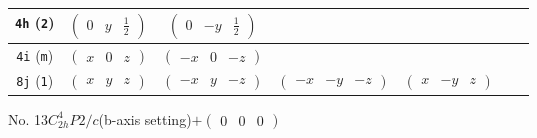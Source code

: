 \documentclass[fleqn,9pt,landscape]{jsarticle}
\begin{document}
\begin{center}
\begin{longtable}{ccccccc}
{\tt 4h} ({\tt 2}) & $ \begin{pmatrix} 0 & y & \frac{1}{2} \end{pmatrix} $ & $ \begin{pmatrix} 0 & - y & \frac{1}{2} \end{pmatrix} $ & $  $ & $  $ \\ \hline
{\tt 4i} ({\tt m}) & $ \begin{pmatrix} x & 0 & z \end{pmatrix} $ & $ \begin{pmatrix} - x & 0 & - z \end{pmatrix} $ & $  $ & $  $ \\ \hline
{\tt 8j} ({\tt 1}) & $ \begin{pmatrix} x & y & z \end{pmatrix} $ & $ \begin{pmatrix} - x & y & - z \end{pmatrix} $ & $ \begin{pmatrix} - x & - y & - z \end{pmatrix} $ & $ \begin{pmatrix} x & - y & z \end{pmatrix} $ \\
\end{longtable}
\end{center}
\newpage
No. 13\quad$C_{2h}^{4}$\quad$P2/c$\quad(b-axis setting)\quad[ monoclinic ]\quad$+\begin{pmatrix} 0 & 0 & 0 \end{pmatrix}$
\end{document}
